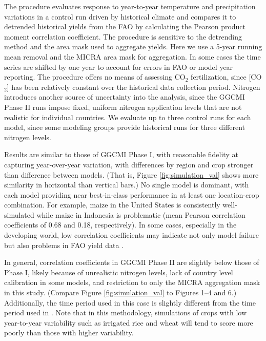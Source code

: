 \documentclass[gmd, manuscript]{copernicus} %
\begin{document}
The \citet{muller_global_2017} procedure evaluates response to year-to-year temperature and precipitation variations in a control run driven by historical climate and compares it to detrended historical yields from the FAO \citep{FAOSTAT} by calculating the Pearson product moment correlation coefficient. 
The procedure is sensitive to the detrending method and the area mask used to aggregate yields. 
Here we use a 5-year running mean removal and the MICRA area mask for aggregation. 
In some cases the time series are shifted by one year to account for errors in FAO or model year reporting. 
The procedure offers no means of assessing CO$_2$ fertilization, since [CO$_2$] has been relatively constant over the historical data collection period. 
Nitrogen introduces another source of uncertainty into the analysis, since the GGCMI Phase II runs impose fixed, uniform nitrogen application levels that are not realistic for individual countries. 
We evaluate up to three control runs for each model, since some modeling groups provide historical runs for three different nitrogen levels. 

Results are similar to those of GGCMI Phase I, with reasonable fidelity at capturing year-over-year variation, with differences by region and crop stronger than difference between models. 
(That is, Figure \ref{fig:simulation_val} shows more similarity in horizontal than vertical bars.) 
No single model is dominant, with each model providing near best-in-class performance in at least one location-crop combination. 
For example, maize in the United States is consistently well-simulated while maize in Indonesia is problematic (mean Pearson correlation coefficients of 0.68 and 0.18, respectively). 
In some cases, especially in the developing world, low correlation coefficients may indicate not only model failure but also problems in FAO yield data \citep{Ray2012,muller_global_2017}. 

In general, correlation coefficients in GGCMI Phase II are slightly below those of Phase I, likely because of unrealistic nitrogen levels, lack of country level calibration in some models, and restriction to only the MICRA aggregation mask in this study. 
(Compare Figure \ref{fig:simulation_val} to \citet{muller_global_2017} Figures 1--4 and 6.)  
Additionally, the time period used in this case is slightly different from the time period used in \citet{muller_global_2017}. 
Note that in this methodology, simulations of crops with low year-to-year variability such as irrigated rice and wheat will tend to score more poorly than those with higher variability.
\end{document}
